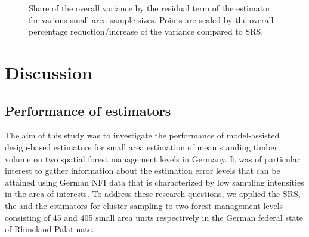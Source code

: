 \begin{figure}[H]
	\centering
	\caption{Share of the overall variance by the residual term of the \psmall{} estimator for various small area sample sizes. Points are scaled by the overall percentage reduction/increase of the variance compared to SRS.}
	\label{fig:fail}
\end{figure}



\section{Discussion}
\label{sec:Dis}

\subsection{Performance of estimators}

The aim of this study was to investigate the performance of model-assisted design-based estimators for small area estimation of mean standing timber volume on two spatial forest management levels in Germany. It was of particular interest to gather information about the estimation error levels that can be attained using German NFI data that is characterized by low sampling intensities in the area of interests. To address these research questions, we applied the SRS, the \psmall{} and the \extpsynth{} estimators for cluster sampling to two forest management levels consisting of 45 and 405 small area units respectively in the German federal state of Rhineland-Palatinate.\par


